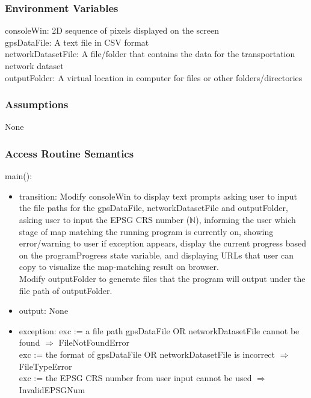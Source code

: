 \documentclass[12pt, titlepage]{article}
\begin{document}
\subsubsection{Environment Variables}
consoleWin: 2D sequence of pixels displayed on the screen\\
gpsDataFile: A text file in CSV format\\
networkDatasetFile: A file/folder that contains the data for the transportation network dataset\\
outputFolder: A virtual location in computer for files or other folders/directories\\

\subsubsection{Assumptions} None

\subsubsection{Access Routine Semantics}

\noindent main():
\begin{itemize}
\item transition: Modify consoleWin to display text prompts asking user to input the file paths for the gpsDataFile, networkDatasetFile and outputFolder, asking user to input the EPSG CRS number ($\mathbb{N}$), informing the user which stage of map matching the running program is currently on, showing error/warning to user if exception appears, display the current progress based on the programProgress state variable, and displaying URLs that user can copy to visualize the map-matching result on browser.\\
Modify outputFolder to generate files that the program will output under the file path of outputFolder.
\item output: None 
\item exception: exc := a file path gpsDataFile OR networkDatasetFile cannot be found $\Rightarrow$  FileNotFoundError \\
  exc := the format of gpsDataFile OR networkDatasetFile is incorrect $\Rightarrow$  FileTypeError\\
  exc := the EPSG CRS number from user input cannot be used $\Rightarrow$  InvalidEPSGNum\\
\end{itemize}

\end{document}
